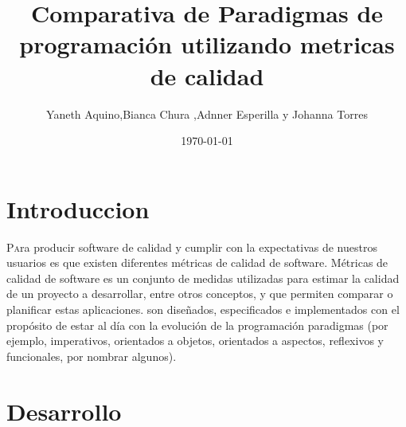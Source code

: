 \documentclass[twoside,twocolumn]{article}
\title{ Comparativa de Paradigmas de programación utilizando metricas de calidad} %
\author{Yaneth Aquino,Bianca Chura ,Adnner Esperilla y Johanna Torres}
\date{\today} %
\begin{document}
\maketitle


\section{Introduccion}

\lettrine[nindent=0em,lines=3]{P}ara  producir  software  de  calidad  y  cumplir  con  la  expectativas  de  nuestros  usuarios es que existen diferentes métricas de calidad de software. Métricas de calidad de software es un conjunto de medidas utilizadas para estimar la calidad de un proyecto   a   desarrollar,   entre   otros   conceptos,   y   que   permiten   comparar   o   planificar   estas aplicaciones. son
diseñados, especificados e implementados con el propósito de estar al día con la evolución de la programación
paradigmas (por ejemplo, imperativos, orientados a objetos, orientados a aspectos, reflexivos y funcionales, por nombrar algunos).
\section{Desarrollo}
\end{document}
